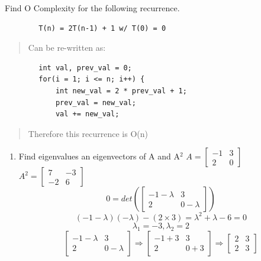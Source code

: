 \documentclass[11pt]{article}
\newenvironment{problem}[2][Problem]{\begin{trivlist}
\item[\hskip \labelsep {\bfseries #1}\hskip \labelsep {\bfseries #2.}]}{\end{trivlist}}
\begin{document}
\begin{problem}{8}
	Find O Complexity for the following recurrence.
	\begin{lstlisting}
		T(n) = 2T(n-1) + 1 w/ T(0) = 0
	\end{lstlisting}
	\begin{verse}
		Can be re-written as:
	\end{verse}
	\begin{lstlisting}
		int val, prev_val = 0;
		for(i = 1; i <= n; i++) {
			int new_val = 2 * prev_val + 1;
			prev_val = new_val;
			val += new_val;
	\end{lstlisting}
	\begin{verse}
		Therefore this recurrence is O(n)
	\end{verse}
\end{problem}
\begin{problem}{9}
	\begin{enumerate}
		\item Find eigenvalues an eigenvectors of A and A$^2$
		\newline		
		$A = \begin{bmatrix} -1 & 3 \\ 2 & 0 \end{bmatrix}$
		$A^2 = \begin{bmatrix} 7 & -3 \\ -2 & 6 \end{bmatrix}$
		\begin{equation}
			0 = det\left(\begin{bmatrix} -1-\lambda & 3 \\ 2 & 0-\lambda \end{bmatrix}\right)
		\end{equation}
		\begin{equation}
			(-1-\lambda)(-\lambda) - (2 \times 3) = \lambda^2 + \lambda - 6 = 0
		\end{equation}
		\begin{equation}
			\lambda_1 = -3, \lambda_2 = 2		
		\end{equation}
		\begin{equation}
			\begin{bmatrix} -1-\lambda & 3 \\ 2 & 0-\lambda \end{bmatrix} \Rightarrow \begin{bmatrix} -1+3 & 3 \\ 2 & 0+3 \end{bmatrix} \Rightarrow \begin{bmatrix} 2 & 3 \\ 2 & 3 \end{bmatrix}

\end{equation}
\end{enumerate}
\end{problem}
\end{document}
